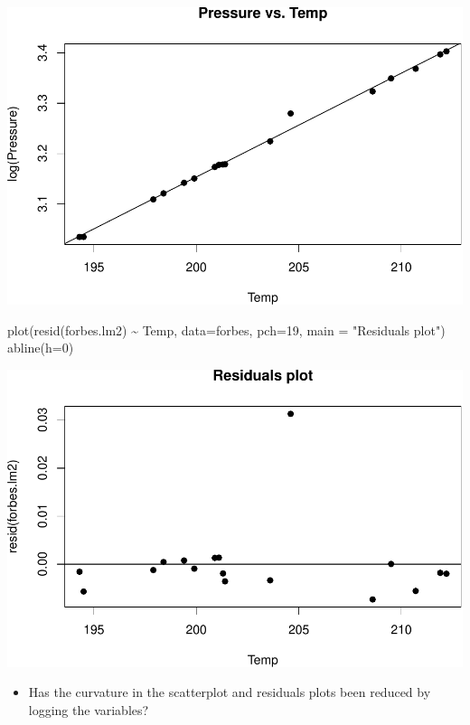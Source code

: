 \documentclass[
]{book}
\newenvironment{Shaded}{\begin{snugshade}}{\end{snugshade}}
\newcommand{\AttributeTok}[1]{\textcolor[rgb]{0.77,0.63,0.00}{#1}}
\newcommand{\DecValTok}[1]{\textcolor[rgb]{0.00,0.00,0.81}{#1}}
\newcommand{\FunctionTok}[1]{\textcolor[rgb]{0.00,0.00,0.00}{#1}}
\newcommand{\NormalTok}[1]{#1}
\newcommand{\SpecialCharTok}[1]{\textcolor[rgb]{0.00,0.00,0.00}{#1}}
\newcommand{\StringTok}[1]{\textcolor[rgb]{0.31,0.60,0.02}{#1}}
\providecommand{\tightlist}{%
  \setlength{\itemsep}{0pt}\setlength{\parskip}{0pt}}
\begin{document}
\includegraphics[width=1\linewidth]{Class_Activity_6_files/figure-latex/unnamed-chunk-31-1}

\begin{Shaded}
\begin{Highlighting}[]
\FunctionTok{plot}\NormalTok{(}\FunctionTok{resid}\NormalTok{(forbes.lm2) }\SpecialCharTok{\textasciitilde{}}\NormalTok{ Temp, }\AttributeTok{data=}\NormalTok{forbes, }\AttributeTok{pch=}\DecValTok{19}\NormalTok{, }\AttributeTok{main =} \StringTok{"Residuals plot"}\NormalTok{)}
\FunctionTok{abline}\NormalTok{(}\AttributeTok{h=}\DecValTok{0}\NormalTok{)}
\end{Highlighting}
\end{Shaded}

\includegraphics[width=1\linewidth]{Class_Activity_6_files/figure-latex/unnamed-chunk-31-2}

\begin{itemize}
\tightlist
\item
  Has the curvature in the scatterplot and residuals plots been reduced by logging the variables?
\end{itemize}
\end{document}
